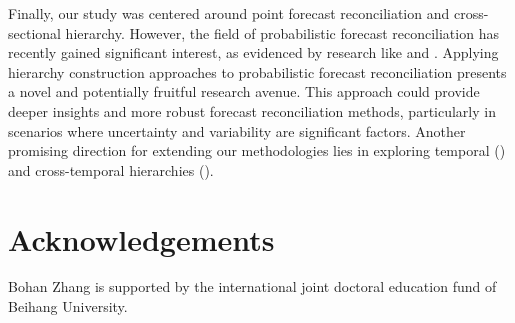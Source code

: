 \documentclass[a4paper,review,12pt,authoryear]{elsarticle}
\begin{document}
Finally, our study was centered around point forecast reconciliation and cross-sectional hierarchy. However, the field of probabilistic forecast reconciliation has recently gained significant interest, as evidenced by research like \cite{panagiotelisProbabilisticForecastReconciliation2023} and \cite{jeonProbabilisticForecastReconciliation2019}. Applying hierarchy construction approaches to probabilistic forecast reconciliation presents a novel and potentially fruitful research avenue. This approach could provide deeper insights and more robust forecast reconciliation methods, particularly in scenarios where uncertainty and variability are significant factors.
Another promising direction for extending our methodologies lies in exploring temporal (\citealp{athanasopoulosForecastingTemporalHierarchies2017}) and cross-temporal hierarchies (\citealp{girolimettoCrosstemporalProbabilisticForecast2023a}). 



\section*{Acknowledgements}

Bohan Zhang is supported by the international joint doctoral education fund of Beihang University.

\begingroup
{}


\endgroup
\end{document}
